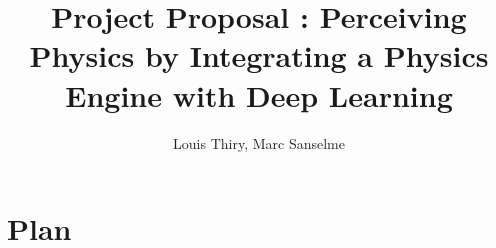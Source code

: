\documentclass[]{article}
\title{Project Proposal : Perceiving Physics by Integrating a Physics Engine with Deep Learning}
\author{Louis Thiry, Marc Sanselme}
\begin{document}
\maketitle

\section{Plan}
\end{document}
